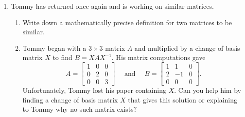 \documentclass[red]{tutorial}
\newcommand{\mat}[1]{\begin{bmatrix}#1\end{bmatrix}}
\theoremstyle{definition}
\theoremstyle{theorem}
\begin{document}
\begin{tutorial}
\begin{enumerate}
	\item Tommy has returned once again and is working on similar matrices.
	\begin{enumerate}
		\item Write down a mathematically precise definition for two matrices to be similar.

\item
Tommy began with a $3\times 3$ matrix $A$ and multiplied by a change of basis matrix $X$ to find $B=XAX^{-1}$. His matrix computations gave
			\[A=\mat{
1 & 0 & 0  \\
0 & 2 & 0 \\
0 & 0 & 3
}\quad \text{ and } \quad
			B=\mat{
1 & 1 & 0  \\
2 & -1 & 0 \\
0 & 0 & 0
}.
\]
	Unfortunately, Tommy lost his paper containing $X$.
			Can you help him by finding a change of basis matrix
			$X$ that gives this solution or explaining to Tommy why no such matrix exists?
		\end{enumerate}
\end{enumerate}
	\end{tutorial}
\end{document}
